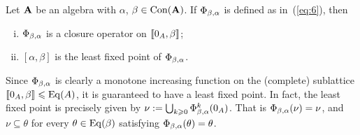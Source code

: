 \begin{lemma}
  \label{lem:fixed-point-comm}
  Let $\mathbf{A}$ be an algebra with $\alpha$, $\beta\in \operatorname{Con}(\mathbf{A})$.
  If
  $\Phi_{\beta, \alpha}$ is defined as in~(\ref{eq:6}), then
  \begin{enumerate}[(i)]
  \item \label{item:1} $\Phi_{\beta, \alpha}$ is a closure operator on %
    $\llbracket 0_A, \beta\rrbracket$;
  \item \label{item:2} $[\alpha, \beta]$ is the least fixed point of $\Phi_{\beta, \alpha}$.
  \end{enumerate}
\end{lemma}
\begin{remark}
  Since $\Phi_{\beta, \alpha}$ is clearly a monotone increasing function on the (complete) sublattice
  $\llbracket 0_A, \beta\rrbracket \leqslant \operatorname{Eq}(A)$, it is guaranteed to have a least fixed point.  In fact,
  the least fixed point is precisely given by 
  $\nu := \bigcup_{k\geqslant 0} \Phi_{\beta, \alpha}^{k}(0_A)$.
  That is $\Phi_{\beta, \alpha}(\nu) = \nu$,
  and $\nu \subseteq \theta$ for every $\theta\in \operatorname{Eq}(\beta)$
  satisfying $\Phi_{\beta, \alpha}(\theta) = \theta$.
   
\end{remark}

